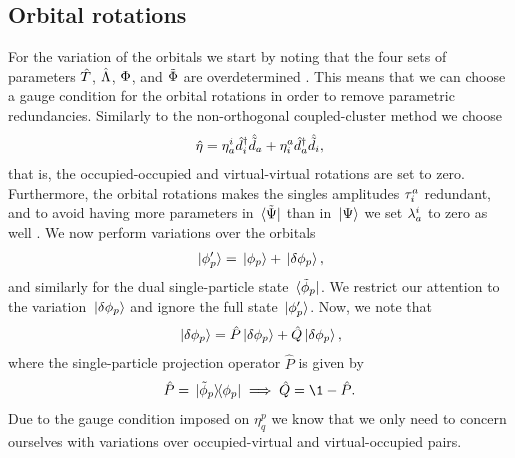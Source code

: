         \subsection{Orbital rotations}
            For the variation of the orbitals we start by noting that the four
            sets of parameters $\hat{T}$, $\hat{\Lambda}$, $\Phi$, and $\tilde{\Phi}$
            are overdetermined \cite{kvaal2012ab}.
            This means that we can choose a gauge condition for the orbital
            rotations in order to remove parametric redundancies.
            Similarly to the non-orthogonal coupled-cluster method we choose
            \begin{align}
                \hat{\eta}
                = \eta^{i}_{a}\hat{d}^{\dagger}_{i}\hat{\tilde{d}}_{a}
                + \eta^{a}_{i}\hat{d}^{\dagger}_{a}\hat{\tilde{d}}_{i},
                \label{eq:eta-gauge}
            \end{align}
            that is, the occupied-occupied and virtual-virtual rotations are set
            to zero.
            Furthermore, the orbital rotations makes the singles amplitudes
            $\tau^{a}_{i}$ redundant, and to avoid having more parameters
            in $\bra*{\tilde{\Psi}}$ than in $\ket*{\Psi}$ we set
            $\lambda^{i}_{a}$ to zero as well \cite{kvaal2012ab}.
            We now perform variations over the orbitals
            \begin{align}
                \ket*{\phi_p'} = \ket*{\phi_p} + \ket*{\delta\phi_p},
            \end{align}
            and similarly for the dual single-particle state
            $\bra*{\tilde{\phi}_p}$.
            We restrict our attention to the variation $\ket*{\delta\phi_p}$ and
            ignore the full state $\ket*{\phi_p'}$.
            Now, we note that
            \begin{align}
                \ket*{\delta\phi_p}
                = \hat{P}\ket*{\delta\phi_p}
                + \hat{Q}\ket*{\delta\phi_p},
            \end{align}
            where the single-particle projection operator $\hat{P}$ is given by
            \begin{align}
                \hat{P}
                = \dyad*{\tilde{\phi}_p}{\phi_p}
                \implies
                \hat{Q} = \1 - \hat{P}.
            \end{align}
            Due to the gauge condition imposed on $\eta^{p}_{q}$ we know that we
            only need to concern ourselves with variations over occupied-virtual
            and virtual-occupied pairs.

